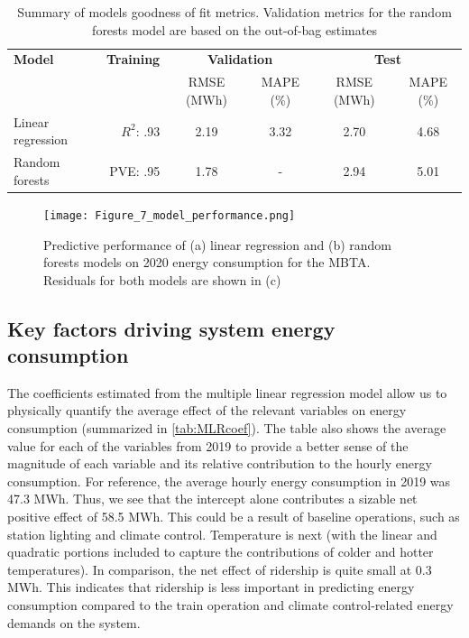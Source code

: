 \documentclass[times]{TRR}
\begin{document}
\begin{table}[ht!]
\caption{Summary of models goodness of fit metrics. Validation metrics for the random forests model are based on the out-of-bag estimates}\small
\label{tab:modelmetrics}
\centering
\begin{tabular}{l r cc cc}
\toprule 
\bf Model & \bf Training & 
\multicolumn{2}{c}{\bf Validation} &
\multicolumn{2}{c}{\bf Test} \\
& &   RMSE (MWh) & MAPE (\%) &   RMSE (MWh) & MAPE (\%)  \\ \midrule
Linear regression & $R^2$: .93 & 2.19    & 3.32&2.70 & 4.68\\
Random forests    & PVE:  .95 & 1.78   & - & 2.94& 5.01\\
\bottomrule  
\end{tabular}
\end{table}


\begin{figure}[ht!]
    \centering
    \texttt{[image: Figure\_7\_model\_performance.png]}
    \caption{Predictive performance of (a) linear regression and (b) random forests models on 2020 energy consumption for the MBTA. Residuals for both models are shown in (c)}
    \label{fig7}
\end{figure}

\subsection{Key factors driving system energy consumption}
The coefficients estimated from the multiple linear regression model allow us to physically quantify the average effect of the relevant variables on energy consumption (summarized in \autoref{tab:MLRcoef}). The table also shows the average value for each of the variables from 2019 to provide a better sense of the magnitude of each variable and its relative contribution to the hourly energy consumption.  For reference, the average hourly energy consumption in 2019 was 47.3 MWh. Thus, we see that the intercept alone contributes a sizable net positive effect of 58.5 MWh. This could be a result of baseline operations, such as station lighting and climate control.
Temperature is next (with the linear and quadratic portions included to capture the contributions of colder and hotter temperatures). In comparison, the net effect of ridership is quite small at 0.3 MWh. This indicates that ridership is less important in predicting energy consumption compared to the train operation and climate control-related energy demands on the system.
\end{document}
